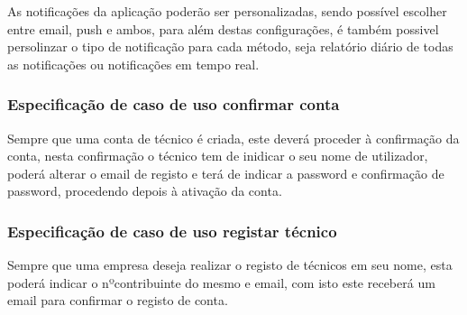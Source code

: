 As notificações da aplicação poderão ser personalizadas, sendo possível escolher entre email, push e ambos,
para além destas configurações, é também possivel persolinzar o tipo de notificação para cada método, seja 
relatório diário de todas as notificações ou notificações em tempo real.



\newpage

\subsubsection{Especificação de caso de uso confirmar conta}

Sempre que uma conta de técnico é criada, este deverá proceder à confirmação da conta, nesta confirmação
o técnico tem de inidicar o seu nome de utilizador, poderá alterar o email de registo e terá de indicar a
password e confirmação de password, procedendo depois à ativação da conta.



\subsubsection{Especificação de caso de uso registar técnico}

Sempre que uma empresa deseja realizar o registo de técnicos em seu nome, esta poderá indicar o nºcontribuinte
do mesmo e email, com isto este receberá um email para confirmar o registo de conta.

